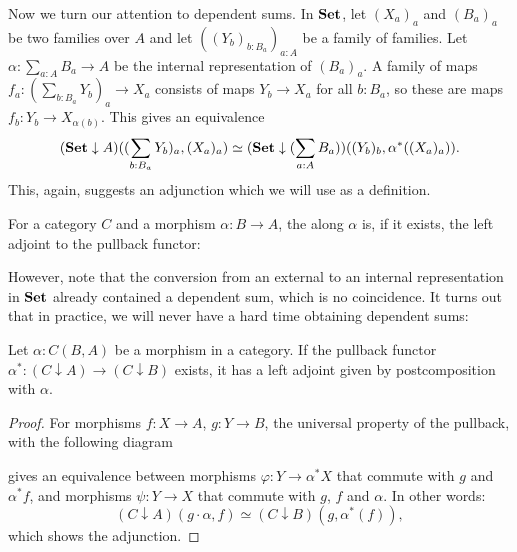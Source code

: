 Now we turn our attention to dependent sums. In $ \mathbf{Set} $, let $ (X_a)_a $ and $ (B_a)_a $ be two families over $ A $ and let $ ((Y_b)_{b : B_a})_{a : A} $ be a family of families. Let $ \alpha: \sum_{a : A} B_a \to A $ be the internal representation of $ (B_a)_a $. A family of maps $ f_a : (\sum_{b : B_a} Y_b)_a \to X_a $ consists of maps $ Y_b \to X_a $ for all $ b : B_a $, so these are maps $ f_b : Y_b \to X_{\alpha(b)} $. This gives an equivalence
\[ (\mathbf{Set} \downarrow A)((\sum_{b : B_a} Y_b)_a, (X_a)_a) \simeq (\mathbf{Set} \downarrow (\sum_{a : A} B_a))((Y_b)_b, \alpha^*((X_a)_a)). \]
This, again, suggests an adjunction which we will use as a definition.
\begin{definition}
  For a category $ C $ and a morphism $ \alpha: B \to A $, the  along $ \alpha $ is, if it exists, the left adjoint to the pullback functor:
  \begin{center}
  \end{center}
\end{definition}

However, note that the conversion from an external to an internal representation in $ \mathbf{Set} $ already contained a dependent sum, which is no coincidence. It turns out that in practice, we will never have a hard time obtaining dependent sums:
\begin{lemma}\label{lem:sum-postcomposition}
  Let $ \alpha : C(B, A) $ be a morphism in a category. If the pullback functor $ \alpha^*: (C \downarrow A) \to (C \downarrow B) $ exists, it has a left adjoint given by postcomposition with $ \alpha $.
\end{lemma}
\begin{proof}
  For morphisms $ f: X \to A $, $ g: Y \to B $, the universal property of the pullback, with the following diagram
  \begin{center}
  \end{center}
  gives an equivalence between morphisms $ \varphi: Y \to \alpha^* X $ that commute with $ g $ and $ \alpha^* f $, and morphisms $ \psi: Y \to X $ that commute with $ g $, $ f $ and $ \alpha $. In other words:
  \[ (C \downarrow A)(g \cdot \alpha, f) \simeq (C \downarrow B)(g, \alpha^*(f)), \]
  which shows the adjunction.
\end{proof}


